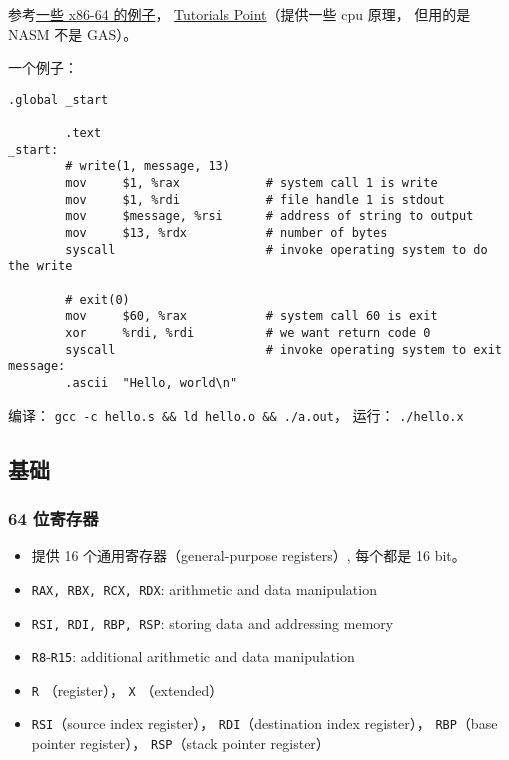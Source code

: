 
\begin{issues}
\issueDraft
\end{issues}

参考\href{https://cs.lmu.edu/~ray/notes/gasexamples/}{一些 x86-64 的例子}， \href{https://www.tutorialspoint.com/assembly_programming/index.htm}{Tutorials Point}（提供一些 cpu 原理， 但用的是 NASM 不是 GAS）。

一个例子：
\begin{lstlisting}[language=none]
        .global _start

        .text
_start:
        # write(1, message, 13)
        mov     $1, %rax            # system call 1 is write
        mov     $1, %rdi            # file handle 1 is stdout
        mov     $message, %rsi      # address of string to output
        mov     $13, %rdx           # number of bytes
        syscall                     # invoke operating system to do the write

        # exit(0)
        mov     $60, %rax           # system call 60 is exit
        xor     %rdi, %rdi          # we want return code 0
        syscall                     # invoke operating system to exit
message:
        .ascii  "Hello, world\n"
\end{lstlisting}

编译： \verb|gcc -c hello.s && ld hello.o && ./a.out|， 运行： \verb|./hello.x|

\subsection{基础}
\subsubsection{64 位寄存器}
\begin{itemize}
\item 提供 16 个通用寄存器（general-purpose registers）, 每个都是 16 bit。
\item \verb|RAX, RBX, RCX, RDX|: arithmetic and data manipulation
\item \verb|RSI, RDI, RBP, RSP|: storing data and addressing memory
\item \verb|R8|-\verb|R15|: additional arithmetic and data manipulation
\item \verb|R| （register）， \verb|X| （extended）
\item \verb|RSI|（source index register）， \verb|RDI|（destination index register）， \verb|RBP|（base pointer register）， \verb|RSP|（stack pointer register）
\end{itemize}

